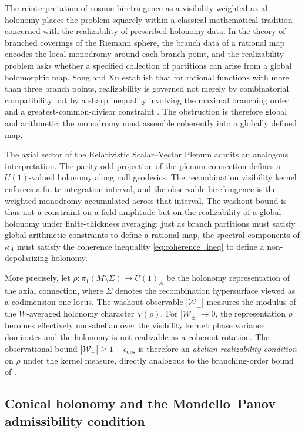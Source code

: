 \documentclass[12pt]{article}
\theoremstyle{definition}
\newcommand{\kA}{\kappa_A}
\newcommand{\Wpm}{\mathcal{W}_\pm}
\begin{document}
The reinterpretation of cosmic birefringence as a visibility-weighted axial holonomy places the problem squarely within a classical mathematical tradition concerned with the realizability of prescribed holonomy data. In the theory of branched coverings of the Riemann sphere, the branch data of a rational map encodes the local monodromy around each branch point, and the realizability problem asks whether a specified collection of partitions can arise from a global holomorphic map. Song and Xu establish that for rational functions with more than three branch points, realizability is governed not merely by combinatorial compatibility but by a sharp inequality involving the maximal branching order and a greatest-common-divisor constraint \cite{SongXu2019}. The obstruction is therefore global and arithmetic: the monodromy must assemble coherently into a globally defined map.

The axial sector of the Relativistic Scalar--Vector Plenum admits an analogous interpretation. The parity-odd projection of the plenum connection defines a $U(1)$-valued holonomy along null geodesics. The recombination visibility kernel enforces a finite integration interval, and the observable birefringence is the weighted monodromy accumulated across that interval. The washout bound is thus not a constraint on a field amplitude but on the realizability of a global holonomy under finite-thickness averaging: just as branch partitions must satisfy global arithmetic constraints to define a rational map, the spectral components of $\kA$ must satisfy the coherence inequality \eqref{eq:coherence_ineq} to define a non-depolarizing holonomy.

More precisely, let $\rho: \pi_1(M\setminus\Sigma)\to U(1)_A$ be the holonomy representation of the axial connection, where $\Sigma$ denotes the recombination hypersurface viewed as a codimension-one locus. The washout observable $|\Wpm|$ measures the modulus of the $W$-averaged holonomy character $\chi(\rho)$. For $|\Wpm|\to0$, the representation $\rho$ becomes effectively non-abelian over the visibility kernel: phase variance dominates and the holonomy is not realizable as a coherent rotation. The observational bound $|\Wpm|\geq1-\epsilon_{\mathrm{obs}}$ is therefore an \emph{abelian realizability condition} on $\rho$ under the kernel measure, directly analogous to the branching-order bound of \cite{SongXu2019}.

\subsection{Conical holonomy and the Mondello--Panov admissibility condition}
\end{document}
